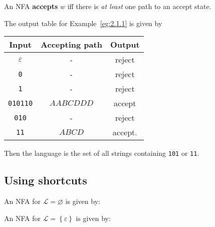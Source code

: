 \documentclass{notes}
\begin{document}
\begin{defn}
  An NFA {\boldmath \bfseries accepts} $w$ iff there is \textit{at least} one path to an accept state.
\end{defn}

\newpage

\begin{eg}
  The output table for Example~\ref{eg:2.1.1} is given by 
  \begin{center}
    \begin{tabular}{ccc}
      Input & Accepting path & Output \\ 
      \hline
      $\varepsilon$ & - & reject \\ 
      \verb~0~ & - & reject \\ 
      \verb~1~ & - & reject \\ 
      \verb~010110~ & $AABCDDD$ & accept \\
      \verb~010~ & - & reject \\ 
      \verb~11~ & $ABCD$ & accept. 
    \end{tabular}
  \end{center}
  
  Then the language is the set of all strings containing \verb~101~ or \verb~11~.
\end{eg}

\subsection{Using shortcuts}

\begin{eg}
  An NFA for $\mathcal L = \varnothing$ is given by: 
  
  \begin{center}
  \end{center}
\end{eg}

\begin{eg}
  An NFA for $\mathcal L = \left \{ \varepsilon \right \}$ is given by: 

  \begin{center}
  \end{center}
\end{eg}
\end{document}
